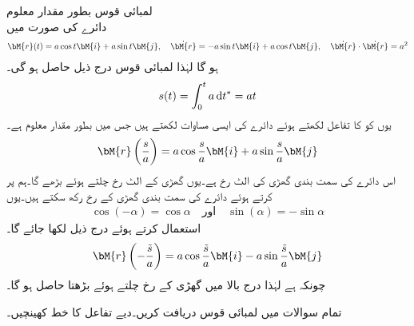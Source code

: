\quad لمبائی قوس بطور مقدار معلوم\\
دائرے کی صورت میں 
\begin{align*}
\bM{r}(t)=a\cos t\bM{i}+a\sin t\bM{j},\quad \dot{\bM{r}}=-a\sin t\bM{i}+a\cos t\bM{j}, \quad \dot{\bM{r}}\cdot \dot{\bM{r}}=a^2
\end{align*}
ہو گا لہٰذا لمبائی قوس درج ذیل حاصل ہو گی۔
\begin{align*}
s(t)=\int_0^t a\dif t^*=at
\end{align*}
یوں  کو  کا تفاعل  لکھتے ہوئے دائرے کی ایسی  مساوات لکھتے ہیں جس میں  بطور مقدار معلوم ہے۔ 
\begin{align*}
\bM{r}\left(\frac{s}{a}\right)=a\cos \frac{s}{a} \bM{i}+a\sin \frac{s}{a}\bM{j}
\end{align*}
اس دائرے کی سمت بندی گھڑی کی الٹ رخ  ہے۔یوں گھڑی کے الٹ رخ چلتے ہوئے  بڑھے گا۔ہم  پر کرتے ہوئے دائرے کی سمت بندی گھڑی کے رخ رکھ سکتے ہیں۔یوں 
\begin{align*}
\cos (-\alpha)=\cos \alpha \quad \text{اور} \quad \sin(\alpha)=-\sin \alpha
\end{align*}
 استعمال کرتے ہوئے درج ذیل لکھا جائے گا۔
\begin{align*}
\bM{r}\left(-\frac{\tilde{s}}{a}\right)=a\cos \frac{\tilde{s}}{a} \bM{i}-a\sin \frac{\tilde{s}}{a}\bM{j}
\end{align*} 
چونکہ  ہے لہٰذا درج بالا میں گھڑی کے رخ چلتے ہوئے بڑھتا  حاصل ہو گا۔

تمام سوالات میں لمبائی قوس دریافت کریں۔دیے تفاعل کا خط کھینچیں۔


